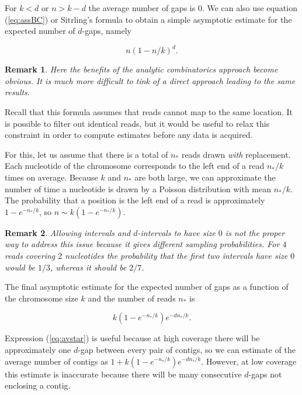 \documentclass{article}
\newtheorem*{remark}{Remark}
\begin{document}
For $k < d$ or $n > k-d$ the average number of gaps is $0$.  We can also
use equation (\ref{eq:assBC}) or Sitrling's formula to obtain a simple
asymptotic estimate for the expected number of $d$-gaps, namely

\begin{equation*}
n\left(1-n/k\right)^d.
\end{equation*}

\begin{remark}
Here the benefits of the analytic combinatorics approach become obvious.
It is much more difficult to tink of a direct approach leading to the same
results.
\end{remark}

Recall that this formula assumes that reads cannot map to the same
location. It is possible to filter out identical reads, but it would be
useful to relax this constraint in order to compute estimates before any
data is acquired.

For this, let us assume that there is a total of $n_*$ reads drawn
\emph{with} replacement. Each nucleotide of the chromosome corresponds to
the left end of a read $n_*/k$ times on average. Because $k$ and $n_*$ are
both large, we can approximate the number of time a nucleotide is drawn by
a Poisson distribution with mean $n_*/k$. The probability that a position
is the left end of a read is approximately $1-e^{-n_*/k}$, so $n \sim
k(1-e^{-n_*/k})$.

\begin{remark}
Allowing intervals and $d$-intervals to have size $0$ is not the proper
way to address this issue because it gives different sampling
probabilities.  For $4$ reads covering $2$ nucleotides the probability
that the first two intervals have size $0$ would be $1/3$, whereas it
should be $2/7$.
\end{remark}

The final asymptotic estimate for the expected number of gaps as a
function of the chromosome size $k$ and the number of reads $n_*$ is

\begin{equation}
\label{eq:avstar}
k(1-e^{-n_*/k})e^{-dn_*/k}.
\end{equation}

Expression (\ref{eq:avstar}) is useful because at high coverage there will
be approximately one $d$-gap between every pair of contigs, so we can
estimate of the average number of contigs as $1 + k(1-e^{-n_*/k})
e^{-dn_*/k}$. However, at low coverage this estimate is inaccurate
because there will be many consecutive $d$-gaps not enclosing a contig.
\end{document}
